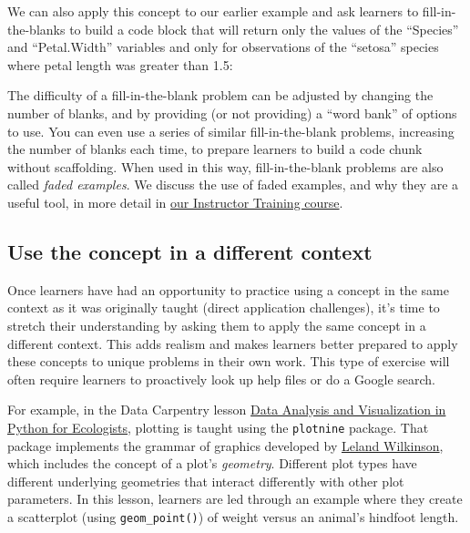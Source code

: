 \documentclass[]{book}
\newenvironment{Shaded}{\begin{snugshade}}{\end{snugshade}}
\newcommand{\FloatTok}[1]{\textcolor[rgb]{0.00,0.00,0.81}{#1}}
\newcommand{\KeywordTok}[1]{\textcolor[rgb]{0.13,0.29,0.53}{\textbf{#1}}}
\newcommand{\NormalTok}[1]{#1}
\newcommand{\OperatorTok}[1]{\textcolor[rgb]{0.81,0.36,0.00}{\textbf{#1}}}
\newcommand{\StringTok}[1]{\textcolor[rgb]{0.31,0.60,0.02}{#1}}
\begin{document}
We can also apply this concept to our earlier example and ask learners to fill-in-the-blanks
to build a code block that will return only the values of the ``Species'' and ``Petal.Width''
variables and only for observations of the ``setosa'' species where petal length
was greater than 1.5:

\begin{Shaded}
\end{Shaded}

The difficulty of a fill-in-the-blank problem can be adjusted by changing the number of blanks,
and by providing (or not providing) a ``word bank'' of options to use. You can even use a series
of similar fill-in-the-blank problems, increasing the number of blanks each time, to prepare
learners to build a code chunk without scaffolding. When used in this way, fill-in-the-blank
problems are also called \emph{faded examples}. We discuss the use of faded examples, and why they
are a useful tool, in more detail in
\href{https://carpentries.github.io/instructor-training/05-memory/index.html}{our Instructor Training course}.

\hypertarget{use-the-concept-in-a-different-context}{%
\subsection{Use the concept in a different context}\label{use-the-concept-in-a-different-context}}

Once learners have had an opportunity to practice using a concept in the same context as
it was originally taught (direct application challenges), it's time to stretch their
understanding by asking them to apply the same concept in a different context. This adds
realism and makes learners better prepared to apply these concepts to unique
problems in their own work. This type of exercise will often require learners to proactively
look up help files or do a Google search.

For example, in the Data Carpentry lesson \href{https://datacarpentry.org/python-ecology-lesson/07-visualization-ggplot-python/index.html}{Data Analysis and Visualization in Python for Ecologists},
plotting is taught using the \texttt{plotnine} package. That package implements the grammar of graphics developed by
\href{https://en.wikipedia.org/wiki/Leland_Wilkinson}{Leland Wilkinson}, which includes the concept
of a plot's \emph{geometry}. Different plot types have different underlying geometries that interact
differently with other plot parameters. In this lesson, learners are led through an example
where they create a scatterplot (using \texttt{geom\_point()}) of weight versus an animal's hindfoot
length.
\end{document}
